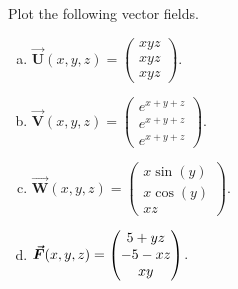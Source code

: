 \documentclass[12pt]{article} %
\newcommand{\vecfieldV}{\boldsymbol{\vec{V}}}
\newcommand{\vecfieldU}{\boldsymbol{\vec{U}}}
\newcommand{\vecfieldW}{\boldsymbol{\vec{W}}}
\begin{document}
\newpage
\begin{problem}
Plot the following vector fields.
\begin{multicols}{2}
\begin{enumerate}[(a)]
    \item $\vecfieldU(x,y,z) = \begin{pmatrix} xyz \\ xyz \\ xyz \end{pmatrix}$.
    \item $\vecfieldV(x,y,z) = \begin{pmatrix} e^{x+y+z} \\ e^{x+y+z} \\ e^{x+y+z} \end{pmatrix}$.
    \item $\vecfieldW(x,y,z) = \begin{pmatrix} x \sin(y) \\ x \cos(y) \\ xz \end{pmatrix}$.
    \item $\boldsymbol{\vec{F}}(x,y,z) = \begin{pmatrix} 5 + yz \\ -5 -xz \\ xy \end{pmatrix}$.
\end{enumerate}
\end{multicols}
\end{problem}
\end{document}
